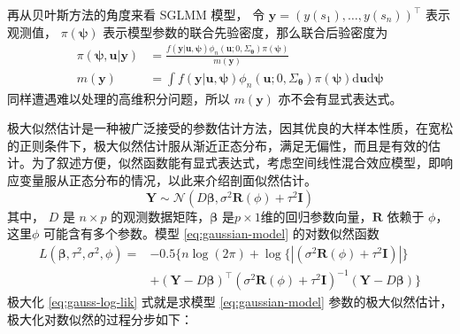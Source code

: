 \documentclass[12pt,a4paper,UTF8,twoside]{book}
\begin{document}
再从贝叶斯方法的角度来看 SGLMM 模型， 令
\(\mathbf{y} = (y(s_1),\ldots,y(s_n))^{\top}\) 表示观测值，
\(\pi(\boldsymbol{\psi})\)
表示模型参数的联合先验密度，那么联合后验密度为 \begin{equation}
\begin{aligned}
\pi(\boldsymbol{\psi},\mathbf{u}|\mathbf{y}) &= \frac{f(\mathbf{y|\mathbf{u}, \boldsymbol{\psi}})\phi_{n}(\mathbf{u};0,\Sigma_{\boldsymbol{\theta}})\pi(\boldsymbol{\psi})}{m(\mathbf{y})} \\
m(\mathbf{y}) &= \int f(\mathbf{y|\mathbf{u}, \boldsymbol{\psi}})\phi_{n}(\mathbf{u};0,\Sigma_{\boldsymbol{\theta}})\pi(\boldsymbol{\psi})\mathrm{d} \mathbf{u} \mathrm{d} \boldsymbol{\psi}
\end{aligned}
\end{equation} \noindent 同样遭遇难以处理的高维积分问题，所以
\(m(\mathbf{y})\) 亦不会有显式表达式。

极大似然估计是一种被广泛接受的参数估计方法，因其优良的大样本性质，在宽松的正则条件下，极大似然估计服从渐近正态分布，满足无偏性，而且是有效的估计。为了叙述方便，似然函数能有显式表达式，考虑空间线性混合效应模型，即响应变量服从正态分布的情况，以此来介绍剖面似然估计。
\begin{equation}
\mathbf{Y} \sim \mathcal{N}(D\boldsymbol{\beta},\sigma^2 \mathbf{R}(\phi) + \tau^2\mathbf{I})
\label{eq:gaussian-model}
\end{equation} \noindent 其中， \(D\) 是 \(n \times p\)
的观测数据矩阵，\(\boldsymbol{\beta}\)
是\(p\times 1\)维的回归参数向量，\(\mathbf{R}\) 依赖于
\(\phi\)，这里\(\phi\) 可能含有多个参数。模型 \eqref{eq:gaussian-model}
的对数似然函数 \begin{equation}
\begin{aligned}
L(\boldsymbol{\beta},\tau^2,\sigma^2,\phi) = {} 
 & - 0.5\{ n\log(2\pi) + \log\{|(\sigma^2\mathbf{R}(\phi)+\tau^2\mathbf{I})|\} \\
 & + (\mathbf{Y} - D\boldsymbol{\beta})^{\top}(\sigma^2\mathbf{R}(\phi)+\tau^2\mathbf{I})^{-1}(\mathbf{Y} - D\boldsymbol{\beta}) \}  
\end{aligned} \label{eq:gauss-log-lik}
\end{equation} \noindent 极大化 \eqref{eq:gauss-log-lik} 式就是求模型
\eqref{eq:gaussian-model}
参数的极大似然估计，极大化对数似然的过程分步如下：
\end{document}
